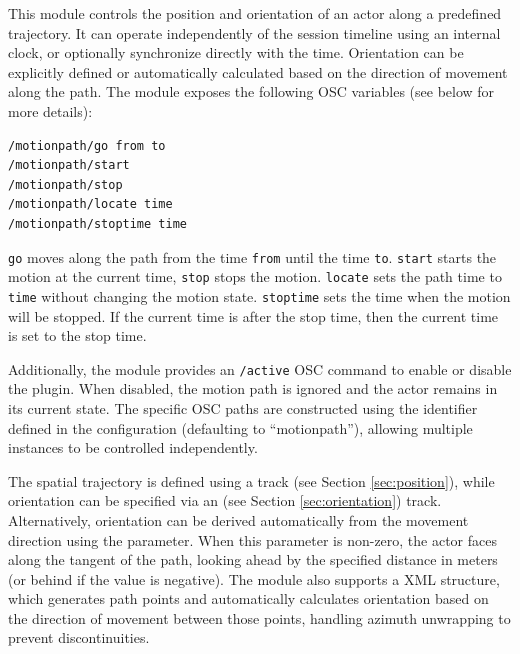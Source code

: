 This module controls the position and orientation of an actor along a
predefined trajectory. It can operate independently of the session
timeline using an internal clock, or optionally synchronize directly
with the \tascar{} time. Orientation can be explicitly defined or
automatically calculated based on the direction of movement along the
path. The module exposes the following OSC variables (see below for
more details):

\begin{verbatim}
/motionpath/go from to
/motionpath/start
/motionpath/stop
/motionpath/locate time
/motionpath/stoptime time
\end{verbatim}
{\tt go} moves along the path from the time {\tt from} until the time {\tt to}.
%
{\tt start} starts the motion at the current time, {\tt stop} stops the motion.
%
{\tt locate} sets the path time to {\tt time} without changing the motion state.
%
{\tt stoptime} sets the time when the motion will be stopped. If the
current time is after the stop time, then the current time is set to
the stop time.

Additionally, the module provides an {\tt /active} OSC command to
enable or disable the plugin. When disabled, the motion path is
ignored and the actor remains in its current state. The specific OSC
paths are constructed using the identifier defined in the
configuration (defaulting to ``motionpath''), allowing multiple
instances to be controlled independently.

The spatial trajectory is defined using a  track (see
Section \ref{sec:position}), while orientation can be specified via an
 (see Section \ref{sec:orientation})
track. Alternatively, orientation can be derived automatically from
the movement direction using the 
parameter. When this parameter is non-zero, the actor faces along the
tangent of the path, looking ahead by the specified distance in meters
(or behind if the value is negative). The module also supports a
 XML structure, which generates path points and
automatically calculates orientation based on the direction of
movement between those points, handling azimuth unwrapping to prevent
discontinuities.




